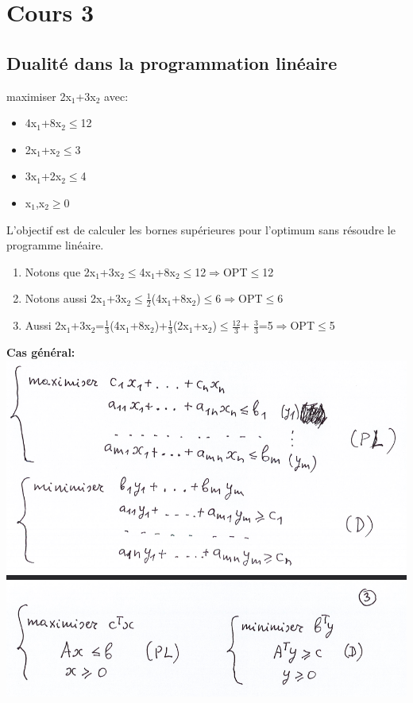 \section{Cours 3}
\subsection{Dualité dans la programmation linéaire}
maximiser 2x$_1$+3x$_2$ avec:
\begin{itemize}
	\item 4x$_1$+8x$_2\leq$12
	\item 2x$_1$+x$_2\leq$3
	\item 3x$_1$+2x$_2\leq$4
	\item x$_1$,x$_2\geq$0
\end{itemize}
L'objectif est de calculer les bornes supérieures pour l'optimum sans résoudre le programme linéaire.
\begin{enumerate}
	\item Notons que 2x$_1$+3x$_2\leq$4x$_1$+8x$_2\leq$12$\Rightarrow$OPT$\leq$12
	\item Notons aussi 2x$_1$+3x$_2\leq\frac{1}{2}$(4x$_1$+8x$_2$)$\leq$6$\Rightarrow$OPT$\leq$6
	\item Aussi 2x$_1$+3x$_2$=$\frac{1}{3}$(4x$_1$+8x$_2$)+$\frac{1}{3}$(2x$_1$+x$_2$)$\leq\frac{12}{3}$+
	$\frac{3}{3}$=5$\Rightarrow$OPT$\leq$5
\end{enumerate}

\textbf{Cas général:}
\includegraphics[width=\linewidth,height=0.75\textheight]{notes/algorithme/cas_general_dualite.png}
